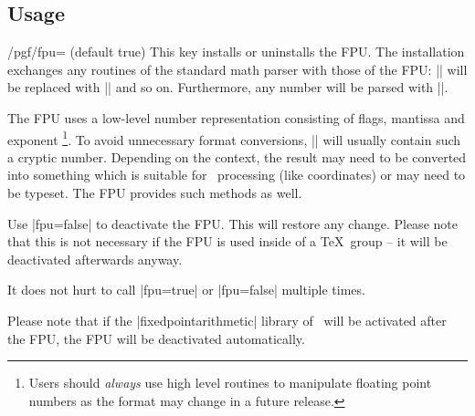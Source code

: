 \subsection{Usage}

\begin{key}{/pgf/fpu= (default true)}
    This key installs or uninstalls the FPU. The installation exchanges any
    routines of the standard math parser with those of the FPU: |\pgfmathadd|
    will be replaced with |\pgfmathfloatadd| and so on. Furthermore, any number
    will be parsed with |\pgfmathfloatparsenumber|.
\begin{codeexample}[preamble={\usepgflibrary{fpu}}]
\pgfmathresult
\end{codeexample}
    \noindent The FPU uses a low-level number representation consisting of
    flags, mantissa and exponent%
        \footnote{Users should \emph{always} use high
        level routines to manipulate floating point numbers as the format may
        change in a future release.}.%
    To avoid unnecessary format conversions, |\pgfmathresult| will usually
    contain such a cryptic number. Depending on the context, the result may
    need to be converted into something which is suitable for \pgfname\
    processing (like coordinates) or may need to be typeset. The FPU provides
    such methods as well.


    Use |fpu=false| to deactivate the FPU. This will restore any change. Please
    note that this is not necessary if the FPU is used inside of a \TeX\ group
    -- it will be deactivated afterwards anyway.

    It does not hurt to call |fpu=true| or |fpu=false| multiple times.

    Please note that if the |fixedpointarithmetic| library of \pgfname\ will
    be activated after the FPU, the FPU will be deactivated automatically.
\end{key}

